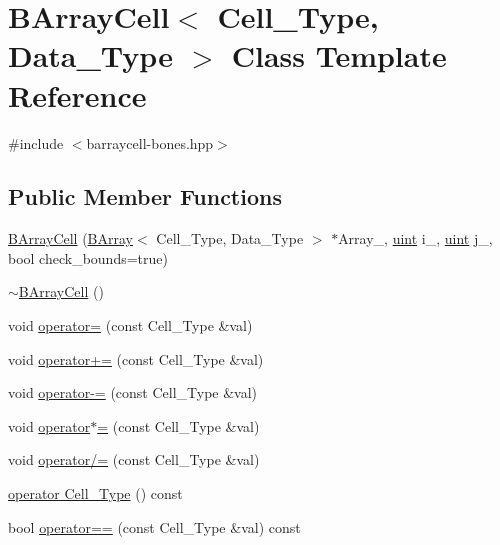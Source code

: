 \hypertarget{class_b_array_cell}{}\section{B\+Array\+Cell$<$ Cell\+\_\+\+Type, Data\+\_\+\+Type $>$ Class Template Reference}
\label{class_b_array_cell}


{\ttfamily \#include $<$barraycell-\/bones.\+hpp$>$}

\subsection*{Public Member Functions}
\begin{DoxyCompactItemize}
\item 
\hyperlink{class_b_array_cell_a1e93556da4b5f6a372e6c65ac1044830}{B\+Array\+Cell} (\hyperlink{class_b_array}{B\+Array}$<$ Cell\+\_\+\+Type, Data\+\_\+\+Type $>$ $\ast$Array\+\_\+, \hyperlink{typedefs_8hpp_a91ad9478d81a7aaf2593e8d9c3d06a14}{uint} i\+\_\+, \hyperlink{typedefs_8hpp_a91ad9478d81a7aaf2593e8d9c3d06a14}{uint} j\+\_\+, bool check\+\_\+bounds=true)
\item 
\hyperlink{class_b_array_cell_a6fbc56424caade490a72685cc35ad0e9}{$\sim$\+B\+Array\+Cell} ()
\item 
void \hyperlink{class_b_array_cell_ad20091ef5961aed4241bd8d0b6d5dd0d}{operator=} (const Cell\+\_\+\+Type \&val)
\item 
void \hyperlink{class_b_array_cell_a2e5c7efcf17bf4acaf17900fb781827b}{operator+=} (const Cell\+\_\+\+Type \&val)
\item 
void \hyperlink{class_b_array_cell_a2f2d39b5e9dfe7d0ef62a42445c85439}{operator-\/=} (const Cell\+\_\+\+Type \&val)
\item 
void \hyperlink{class_b_array_cell_abc193e5d3dd8d04e5d4bb8d808fde35d}{operator$\ast$=} (const Cell\+\_\+\+Type \&val)
\item 
void \hyperlink{class_b_array_cell_aa5debb920d8ffc246e7d463ac8e26152}{operator/=} (const Cell\+\_\+\+Type \&val)
\item 
\hyperlink{class_b_array_cell_a698f664c230f91bf03a97966378e339b}{operator Cell\+\_\+\+Type} () const
\item 
bool \hyperlink{class_b_array_cell_a8d28c5b68b442ddf94cb99d8bc2f9cb9}{operator==} (const Cell\+\_\+\+Type \&val) const
\end{DoxyCompactItemize}



